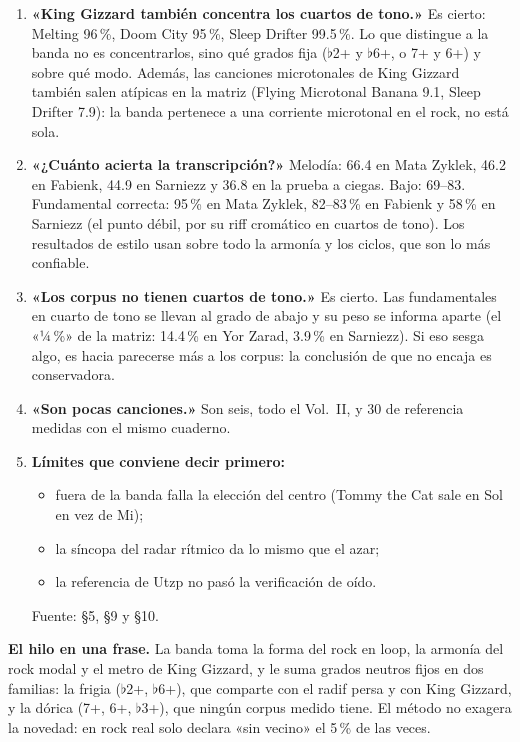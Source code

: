 \documentclass[11pt,a4paper]{article}
\newcommand{\fuente}[1]{\par{\small\color{gris}Fuente: #1}}
\newcommand{\seccion}[1]{\vspace{0.4cm}{\Large\color{azul}\textbf{#1}}\par\vspace{0.1cm}}
\newcommand{\bem}{$\flat$}
\begin{document}
\seccion{6. Preguntas difíciles}
\begin{enumerate}[resume]
\item \textbf{«King Gizzard también concentra los cuartos de tono.»} Es cierto: Melting 96\,\%, Doom City 95\,\%,
  Sleep Drifter 99.5\,\%. Lo que distingue a la banda no es concentrarlos, sino qué grados fija (\bem 2+ y \bem 6+, o
  7+ y 6+) y sobre qué modo. Además, las canciones microtonales de King Gizzard también salen atípicas en la matriz
  (Flying Microtonal Banana 9.1, Sleep Drifter 7.9): la banda pertenece a una corriente microtonal en el rock, no está
  sola.
\item \textbf{«¿Cuánto acierta la transcripción?»} Melodía: 66.4 en Mata Zyklek, 46.2 en Fabienk, 44.9 en Sarniezz y
  36.8 en la prueba a ciegas. Bajo: 69--83. Fundamental correcta: 95\,\% en Mata Zyklek, 82--83\,\% en Fabienk y
  58\,\% en Sarniezz (el punto débil, por su riff cromático en cuartos de tono). Los resultados de estilo usan sobre
  todo la armonía y los ciclos, que son lo más confiable.
\item \textbf{«Los corpus no tienen cuartos de tono.»} Es cierto. Las fundamentales en cuarto de tono se llevan al
  grado de abajo y su peso se informa aparte (el «¼\,\%» de la matriz: 14.4\,\% en Yor Zarad, 3.9\,\% en Sarniezz).
  Si eso sesga algo, es hacia parecerse más a los corpus: la conclusión de que no encaja es conservadora.
\item \textbf{«Son pocas canciones.»} Son seis, todo el Vol.~II, y 30 de referencia medidas con el mismo cuaderno.
\item \textbf{Límites que conviene decir primero:}
  \begin{itemize}
  \item fuera de la banda falla la elección del centro (Tommy the Cat sale en Sol en vez de Mi);
  \item la síncopa del radar rítmico da lo mismo que el azar;
  \item la referencia de Utzp no pasó la verificación de oído.
  \end{itemize}
  \fuente{§5, §9 y §10.}
\end{enumerate}

\vspace{0.3cm}
\colorbox{azul!8}{\parbox{\dimexpr\linewidth-2\fboxsep}{%
\textbf{El hilo en una frase.} La banda toma la forma del rock en loop, la armonía del rock modal y el metro de King
Gizzard, y le suma grados neutros fijos en dos familias: la frigia (\bem 2+, \bem 6+), que comparte con el radif persa
y con King Gizzard, y la dórica (7+, 6+, \bem 3+), que ningún corpus medido tiene. El método no
exagera la novedad: en rock real solo declara «sin vecino» el 5\,\% de las veces.}}
\end{document}
